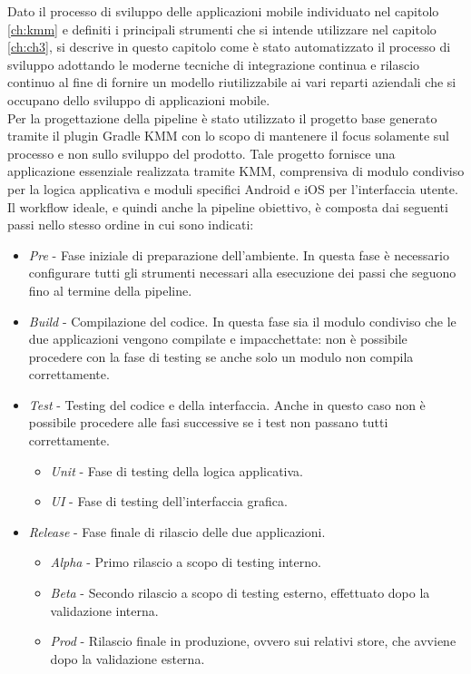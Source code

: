 
Dato il processo di sviluppo delle applicazioni mobile individuato nel capitolo \ref{ch:kmm} e definiti i principali strumenti che si intende utilizzare nel capitolo \ref{ch:ch3}, si descrive in questo capitolo come è stato automatizzato il processo di sviluppo adottando le moderne tecniche di integrazione continua e rilascio continuo al fine di fornire un modello riutilizzabile ai vari reparti aziendali che si occupano dello sviluppo di applicazioni mobile.\\
Per la progettazione della pipeline è stato utilizzato il progetto base generato tramite il plugin Gradle KMM con lo scopo di mantenere il focus solamente sul processo e non sullo sviluppo del prodotto. Tale progetto fornisce una applicazione essenziale realizzata tramite KMM, comprensiva di modulo condiviso per la logica applicativa e moduli specifici Android e iOS per l'interfaccia utente.\\
Il workflow ideale, e quindi anche la pipeline obiettivo, è composta dai seguenti passi nello stesso ordine in cui sono indicati:
\begin{itemize}
    \item \textit{Pre} - Fase iniziale di preparazione dell'ambiente. In questa fase è necessario configurare tutti gli strumenti necessari alla esecuzione dei passi che seguono fino al termine della pipeline.
    \item \textit{Build} - Compilazione del codice. In questa fase sia il modulo condiviso che le due applicazioni vengono compilate e impacchettate: non è possibile procedere con la fase di testing se anche solo un modulo non compila correttamente.
    \item \textit{Test} - Testing del codice e della interfaccia. Anche in questo caso non è possibile procedere alle fasi successive se i test non passano tutti correttamente.
    \begin{itemize}
        \item \textit{Unit} - Fase di testing della logica applicativa.
        \item \textit{UI} - Fase di testing dell'interfaccia grafica.
    \end{itemize}
    \item \textit{Release} - Fase finale di rilascio delle due applicazioni.
    \begin{itemize}
        \item \textit{Alpha} - Primo rilascio a scopo di testing interno.
        \item \textit{Beta} - Secondo rilascio a scopo di testing esterno, effettuato dopo la validazione interna.
        \item \textit{Prod} - Rilascio finale in produzione, ovvero sui relativi store, che avviene dopo la validazione esterna.
    \end{itemize}
\end{itemize}


